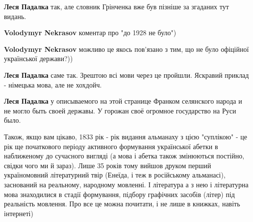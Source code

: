 \begin{itemize}
\begin{itemize}
\begin{itemize}
\textbf{Леся Падалка} так, але словник Грінченка вже був пізніше за згаданих тут видань.


 
\textbf{Volodymyr Nekrasov} коментар про "до 1928 не було")
\end{itemize}

 
\textbf{Volodymyr Nekrasov} можливо це якось пов'язано з тим, що не було офіційної української держави?))

\begin{itemize}
 
\textbf{Леся Падалка} саме так. Зрештою всі мови через це пройшли. Яскравий приклад - німецька мова, але не хохдойч.


 
\textbf{Леся Падалка} у описываемого на этой странице Франком селянского народа и не могло быть своей державы.
У горожан своё огромное государство на Руси было.
\end{itemize}

\end{itemize}

 

Також, якщо вам цікаво, 1833 рік - рік видання альманаху з цією "суплікою" - це
рік ще початкового періоду активного формування української абетки в
наближеному до сучасного вигляді (а мова і абетка також змінюються постійно,
свідки чого ми й зараз). Лише 35 років тому вийшов друком перший україномовний
літературний твір (Енеїда, і теж в російському альманасі), заснований на
реальному, народному мовленні. І література а з нею і літературна мова
знаходилися в стадії формування, підбору графічних засобів (літер) під
реальність мовлення. Про все це можна почитати, і не лише в книжках, навіть
інтернеті)


\end{itemize}
